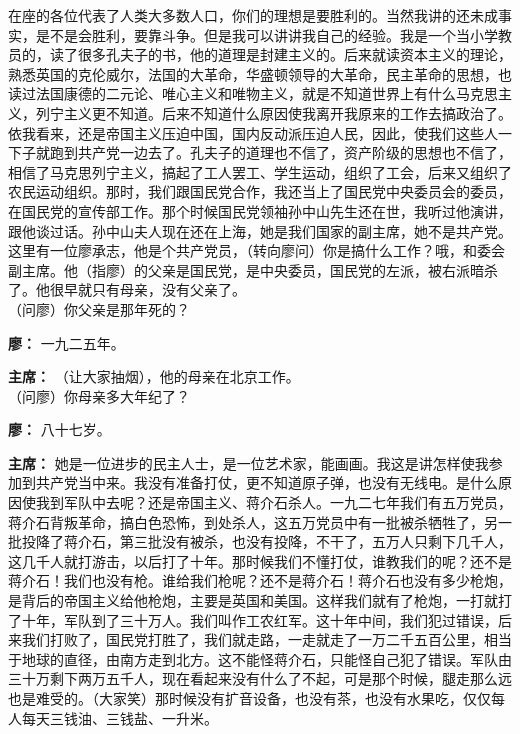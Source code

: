 \begin{list}{}
在座的各位代表了人类大多数人口，你们的理想是要胜利的。当然我讲的还未成事实，是不是会胜利，要靠斗争。但是我可以讲讲我自己的经验。我是一个当小学教员的，读了很多孔夫子的书，他的道理是封建主义的。后来就读资本主义的理论，熟悉英国的克伦威尔，法国的大革命，华盛顿领导的大革命，民主革命的思想，也读过法国康德的二元论、唯心主义和唯物主义，就是不知道世界上有什么马克思主义，列宁主义更不知道。后来不知道什么原因使我离开我原来的工作去搞政治了。依我看来，还是帝国主义压迫中国，国内反动派压迫人民，因此，使我们这些人一下子就跑到共产党一边去了。孔夫子的道理也不信了，资产阶级的思想也不信了，相信了马克思列宁主义，搞起了工人罢工、学生运动，组织了工会，后来又组织了农民运动组织。那时，我们跟国民党合作，我还当上了国民党中央委员会的委员，在国民党的宣传部工作。那个时候国民党领袖孙中山先生还在世，我听过他演讲，跟他谈过话。孙中山夫人现在还在上海，她是我们国家的副主席，她不是共产党。 这里有一位廖承志，他是个共产党员，（转向廖问）你是搞什么工作？哦，和委会副主席。他（指廖）的父亲是国民党，是中央委员，国民党的左派，被右派暗杀了。他很早就只有母亲，没有父亲了。\\（问廖）你父亲是那年死的？

\item[\textbf{廖：}] 一九二五年。

\item[\textbf{主席：}] （让大家抽烟），他的母亲在北京工作。\\（问廖）你母亲多大年纪了？

\item[\textbf{廖：}] 八十七岁。

\item[\textbf{主席：}] 她是一位进步的民主人士，是一位艺术家，能画画。我这是讲怎样使我参加到共产党当中来。我没有准备打仗，更不知道原子弹，也没有无线电。是什么原因使我到军队中去呢？还是帝国主义、蒋介石杀人。一九二七年我们有五万党员，蒋介石背叛革命，搞白色恐怖，到处杀人，这五万党员中有一批被杀牺牲了，另一批投降了蒋介石，第三批没有被杀，也没有投降，不干了，五万人只剩下几千人，这几千人就打游击，以后打了十年。那时候我们不懂打仗，谁教我们的呢？还不是蒋介石！我们也没有枪。谁给我们枪呢？还不是蒋介石！蒋介石也没有多少枪炮，是背后的帝国主义给他枪炮，主要是英国和美国。这样我们就有了枪炮，一打就打了十年，军队到了三十万人。我们叫作工农红军。这十年中间，我们犯过错误，后来我们打败了，国民党打胜了，我们就走路，一走就走了一万二千五百公里，相当于地球的直径，由南方走到北方。这不能怪蒋介石，只能怪自己犯了错误。军队由三十万剩下两万五千人，现在看起来没有什么了不起，可是那个时候，腿走那么远也是难受的。（大家笑）那时候没有扩音设备，也没有茶，也没有水果吃，仅仅每人每天三钱油、三钱盐、一升米。


\end{list}
